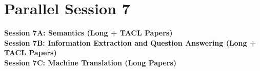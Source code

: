 \newpage
\section*{Parallel Session 7}
{\bfseries\large Session 7A: Semantics (Long + TACL Papers)}\\
\TrackALoc\hfill\sessionchair{}{}
\clearpage
{\bfseries\large Session 7B: Information Extraction and Question Answering (Long + TACL Papers)}\\
\TrackBLoc\hfill\sessionchair{}{}
\clearpage
{\bfseries\large Session 7C: Machine Translation (Long Papers)}\\
\TrackCLoc\hfill\sessionchair{}{}
\clearpage


